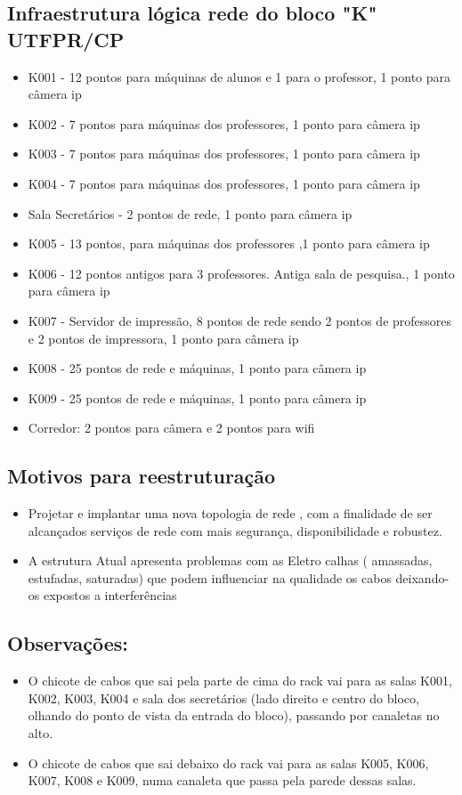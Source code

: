 \documentclass[	DIV=calc,%
paper=a4,%
fontsize=12pt,%
onecolumn]{scrartcl}	 					%
\begin{document}
	\subsection{Infraestrutura lógica rede do bloco "K" UTFPR/CP}
	\begin{itemize}
		\item K001 - 12 pontos para máquinas de alunos e 1 para o professor, 1 ponto para câmera ip
		\item K002 - 7 pontos para máquinas dos professores, 1 ponto para câmera ip
		\item K003 - 7 pontos para máquinas dos professores, 1 ponto para câmera ip
		\item K004 - 7 pontos para máquinas dos professores, 1 ponto para câmera ip
		\item Sala Secretários - 2 pontos de rede, 1 ponto para câmera ip
		\item K005 - 13 pontos, para máquinas dos professores ,1 ponto para câmera ip
		\item K006 - 12 pontos antigos para 3 professores. Antiga sala de pesquisa., 1 ponto para câmera ip
		\item K007 - Servidor de impressão, 8 pontos de rede sendo 2 pontos de professores e 2 pontos de impressora, 1 ponto para câmera ip
		\item K008 - 25 pontos de rede e máquinas, 1 ponto para câmera ip
		\item K009 - 25 pontos de rede e máquinas, 1 ponto para câmera ip
		\item Corredor: 2 pontos para câmera e 2 pontos para wifi
	\end{itemize}
	\subsection{Motivos para reestruturação}
	\begin{itemize}
		\item Projetar e implantar uma nova topologia de rede , com a finalidade de ser alcançados serviços de rede com mais segurança, disponibilidade e robustez.
		\item A estrutura Atual apresenta problemas com as Eletro calhas ( amassadas, estufadas, saturadas) que podem influenciar na qualidade os cabos deixando-os expostos a interferências
	\end{itemize}
	\subsection{Observações:}
	\begin{itemize}
		\item O chicote de cabos que sai pela parte de cima do rack vai para as salas K001, K002, K003, K004 e sala dos secretários (lado direito e centro do bloco, olhando do ponto de vista da entrada do bloco), passando por canaletas no alto. 
		\item O chicote de cabos que sai debaixo do rack vai para as salas K005, K006, K007, K008 e K009, numa canaleta que passa pela parede dessas salas.
	\end{itemize}
	
\end{document}
